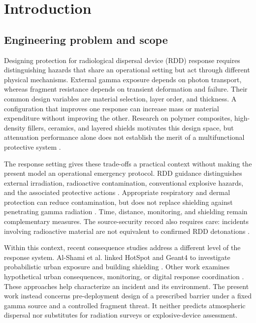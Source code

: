 \documentclass[12pt]{elsarticle}
\begin{document}
	\section{Introduction}
\subsection{Engineering problem and scope}
Designing protection for radiological dispersal device (RDD) response requires distinguishing hazards that share an operational setting but act through different physical mechanisms. External gamma exposure depends on photon transport, whereas fragment resistance depends on transient deformation and failure. Their common design variables are material selection, layer order, and thickness. A configuration that improves one response can increase mass or material expenditure without improving the other. Research on polymer composites, high-density fillers, ceramics, and layered shields motivates this design space, but attenuation performance alone does not establish the merit of a multifunctional protective system \cite{MoreEtAl2021,PrabhuEtAl2023,GilysEtAl2022,MarxRabiei2017CMF,Derradji2020Hybrid,Mehelli2021BallisticRadiation}.

The response setting gives these trade-offs a practical context without making the present model an operational emergency protocol. RDD guidance distinguishes external irradiation, radioactive contamination, conventional explosive hazards, and the associated protective actions \cite{IAEA2006FirstResponders,DHS2017RDD,DHS2025RDD}. Appropriate respiratory and dermal protection can reduce contamination, but does not replace shielding against penetrating gamma radiation \cite{REMM2026PPE,OSHA2026Radiation}. Time, distance, monitoring, and shielding remain complementary measures. The source-security record also requires care: incidents involving radioactive material are not equivalent to confirmed RDD detonations \cite{IAEA2024ITDB}.

Within this context, recent consequence studies address a different level of the response system. Al-Shami et al. linked HotSpot and Geant4 to investigate probabilistic urban exposure and building shielding \cite{AlShami2026}. Other work examines hypothetical urban consequences, monitoring, or digital response coordination \cite{ObooEtAl2024,AlrammahAlShareef2023,BrambillaEtAl2023}. These approaches help characterize an incident and its environment. The present work instead concerns pre-deployment design of a prescribed barrier under a fixed gamma source and a controlled fragment threat. It neither predicts atmospheric dispersal nor substitutes for radiation surveys or explosive-device assessment.
\end{document}
